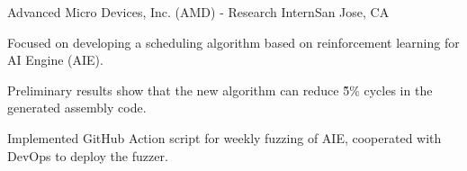 \renewcommand{\timeInterval}{\DTMdisplaydate{2023}{7}{17}{-1} - \present}

\ifx\lang\eng
	\begin{rSubsection}{Advanced Micro Devices, Inc. (AMD)}{\timeInterval}{Research Intern}{San Jose, CA}
		\item Focused on developing a scheduling algorithm based on reinforcement learning for AI Engine (AIE).
		\item Preliminary results show that the new algorithm can reduce \~5\% cycles in the generated assembly code.
		\item Implemented GitHub Action script for weekly fuzzing of AIE, cooperated with DevOps to deploy the fuzzer.
	\end{rSubsection}
\else
\fi

\renewcommand{\timeInterval}{}